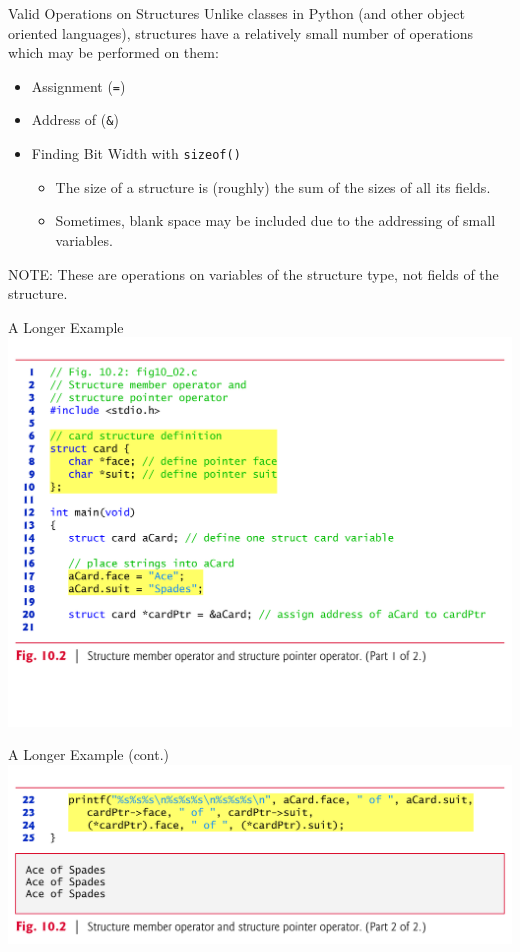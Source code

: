 \documentclass[11pt]{beamer}
\begin{document}
\begin{frame}{Valid Operations on Structures}
Unlike classes in Python (and other object oriented languages), structures have a relatively small number of operations which may be performed on them:
\begin{itemize}
\item Assignment (\texttt{=})
\item Address of (\texttt{\&})
\item Finding Bit Width with \texttt{sizeof()}
\begin{itemize}
\item The size of a structure is (roughly) the sum of the sizes of all its fields.  
\item Sometimes, blank space may be included due to the addressing of small variables.
\end{itemize}
\end{itemize}
NOTE: These are operations on variables of the structure type, not fields of the structure.
\end{frame}

\begin{frame}{A Longer Example}
\center
\includegraphics[scale=0.35]{struct1.png}
\end{frame}

\begin{frame}{A Longer Example (cont.)}
\center
\includegraphics[scale=0.12]{struct2.png}
\end{frame}
\end{document}

